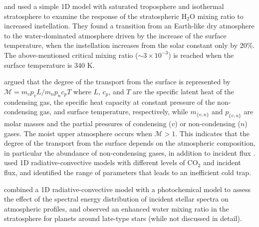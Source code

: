 \documentclass[11pt,numberedappendix,twocolappendix,]{emulateapj}
\def\water{H$_2$O }
\begin{document}
\citet{Kasting1993} and \citet{Kopparapu2013} used a simple 1D model with saturated troposphere and isothermal stratosphere to examine the response of the stratospheric \water mixing ratio to increased instellation. 
They found a transition from an Earth-like dry atmosphere to the water-dominated atmosphere driven by the increase of the surface temperature, when the instellation increases from the solar constant only by 20\%. 
The above-mentioned critical mixing ratio ($\sim 3 \times 10^{-3}$) is reached when the surface temperature is 340 K. 


\citet{Wordsworth2013,Wordsworth2014} argued that the degree of the transport from the surface is represented by $\mathcal{M} = m_v p_v L / m_n p_n c_p T $ where $L$, $c_p$, and $T$ are the specific latent heat of the condensing gas, the specific heat capacity at constant pressure of the non-condensing gas, and surface  temperature, respectively, while $m_{\{v,n\}}$ and $p_{\{v,n\}}$ are molar masses  and the partial pressures of condensing ($v$) or non-condensing ($n$) gases. 
The moist upper atmosphere occurs when $\mathcal{M} > 1$. 
This indicates that the degree of the transport from the surface depends on the atmospheric composition, in particular the abundance of non-condensing gases, in addition to incident flux  \citep{Wordsworth2014}. 
\citet{Wordsworth2013} used 1D radiative-convective models with different levels of CO$_2$ and incident flux, and identified the range of parameters that leads to an inefficient cold trap. 

\citet{Rugheimer2013,Rugheimer2015} combined a 1D radiative-convective model with a photochemical model to assess the effect of the spectral energy distribution of incident stellar spectra on atmospheric profiles, and observed an enhanced water mixing ratio in the stratosphere for planets around late-type stars (while not discussed in detail). 
\end{document}

